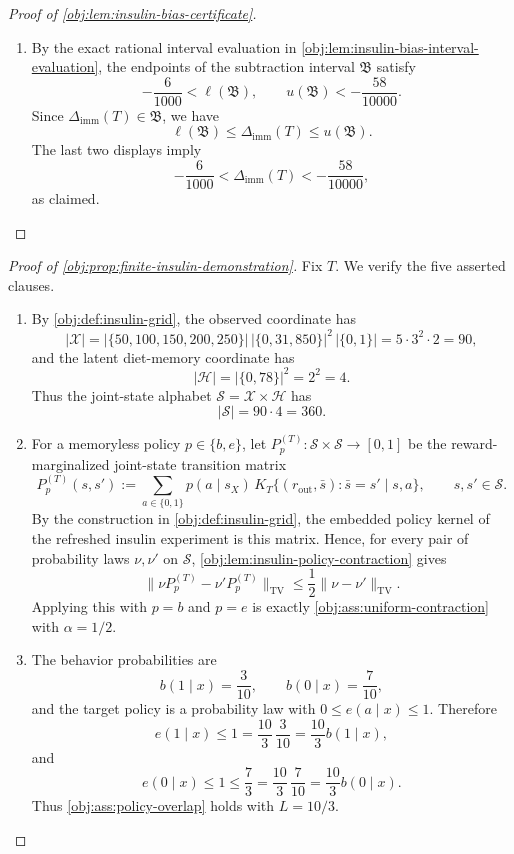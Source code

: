 \documentclass[11pt]{article}
\begin{document}
\begin{proof}[Proof of \cref{obj:lem:insulin-bias-certificate}]
\begin{enumerate}
\item By the exact rational interval evaluation in \cref{obj:lem:insulin-bias-interval-evaluation}, the endpoints of the subtraction interval \(\mathfrak B\) satisfy
\[
-\frac{6}{1000}<\ell(\mathfrak B),
\qquad
u(\mathfrak B)<-\frac{58}{10000}.
\]
Since \(\Delta_{\mathrm{imm}}(T)\in\mathfrak B\), we have
\[
\ell(\mathfrak B)
\le
\Delta_{\mathrm{imm}}(T)
\le
u(\mathfrak B).
\]
The last two displays imply
\[
-\frac{6}{1000}
<
\Delta_{\mathrm{imm}}(T)
<
-\frac{58}{10000},
\]
as claimed. %
\end{enumerate}
\end{proof}

\begin{proof}[Proof of \cref{obj:prop:finite-insulin-demonstration}]
Fix \(T\). We verify the five asserted clauses.

\begin{enumerate}
\item By \cref{obj:def:insulin-grid}, the observed coordinate has
\[
|\mathcal X|
=
|\{50,100,150,200,250\}|\,
|\{0,31,850\}|^2\,|\{0,1\}|
=
5\cdot 3^2\cdot 2
=
90,
\]
and the latent diet-memory coordinate has
\[
|\mathcal H|=|\{0,78\}|^2=2^2=4.
\]
Thus the joint-state alphabet \(\mathcal S=\mathcal X\times\mathcal H\) has
\[
|\mathcal S|=90\cdot4=360.
\]

\item For a memoryless policy \(p\in\{b,e\}\), let \(P_p^{(T)}:\mathcal S\times\mathcal S\to[0,1]\) be the reward-marginalized joint-state transition matrix
\[
P_p^{(T)}(s,s')
:=
\sum_{a\in\{0,1\}}p(a\mid s_X)\,
K_T\{(r_{\mathrm{out}},\bar s):\bar s=s'\mid s,a\},
\qquad s,s'\in\mathcal S .
\]
By the construction in \cref{obj:def:insulin-grid}, the embedded policy kernel of the refreshed insulin experiment is this matrix. Hence, for every pair of probability laws \(\nu,\nu'\) on \(\mathcal S\), \cref{obj:lem:insulin-policy-contraction} gives
\[
\|\nu P_p^{(T)}-\nu'P_p^{(T)}\|_{\mathrm{TV}}
\le
\frac12\|\nu-\nu'\|_{\mathrm{TV}} .
\]
Applying this with \(p=b\) and \(p=e\) is exactly \cref{obj:ass:uniform-contraction} with \(\alpha=1/2\). %

\item The behavior probabilities are
\[
b(1\mid x)=\frac3{10},
\qquad
b(0\mid x)=\frac7{10},
\]
and the target policy is a probability law with \(0\le e(a\mid x)\le1\). Therefore
\[
e(1\mid x)\le 1=\frac{10}{3}\,\frac3{10}
=\frac{10}{3}b(1\mid x),
\]
and
\[
e(0\mid x)\le 1\le \frac73
=\frac{10}{3}\,\frac7{10}
=\frac{10}{3}b(0\mid x).
\]
Thus \cref{obj:ass:policy-overlap} holds with \(L=10/3\). %


\end{enumerate}
\end{proof}
\end{document}
